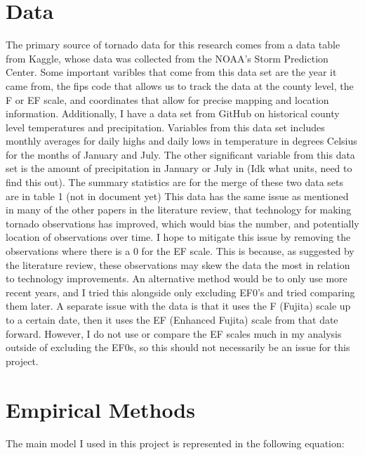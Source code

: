 \documentclass[12pt,english]{article}
\begin{document}
\section{Data}\label{sec:data}
The primary source of tornado data for this research comes from a data table from Kaggle, whose data was collected from the NOAA's Storm Prediction Center. Some important varibles that come from this data set are the year it came from, the fips code that allows us to track the data at the county level, the F or EF scale, and coordinates that allow for precise mapping and location information. Additionally, I have a data set from GitHub on historical county level temperatures and precipitation. Variables from this data set includes monthly averages for daily highs and daily lows in temperature in degrees Celsius for the months of January and July. The other significant variable from this data set is the amount of precipitation in January or July in (Idk what units, need to find this out). The summary statistics are for the merge of these two data sets are in table 1 (not in document yet)
This data has the same issue as mentioned in many of the other papers in the literature review, that technology for making tornado observations has improved, which would bias the number, and potentially location of observations over time. I hope to mitigate this issue by removing the observations where there is a 0 for the EF scale. This is because, as suggested by the literature review, these observations may skew the data the most in relation to technology improvements. An alternative method would be to only use more recent years, and I tried this alongside only excluding EF0's and tried comparing them later. A separate issue with the data is that it uses the F (Fujita) scale up to a certain date, then it uses the EF (Enhanced Fujita) scale from that date forward. However, I do not use or compare the EF scales much in my analysis outside of excluding the EF0s, so this should not necessarily be an issue for this project. 



\section{Empirical Methods}\label{sec:methods}
The main model I used in this project is represented in the following equation:
\end{document}
